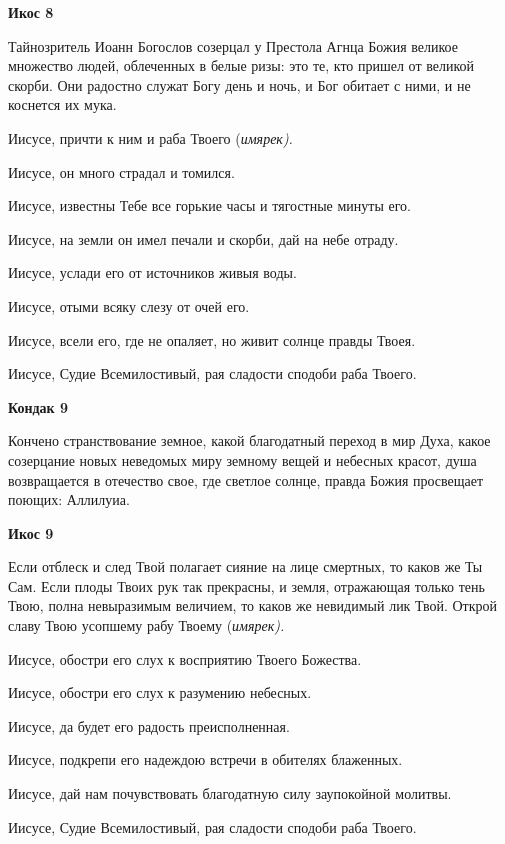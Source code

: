 \medskip


\bfseries Икос 8\normalfont{}


Тайнозритель Иоанн Богослов созерцал у Престола Агнца Божия великое множество людей, облеченных в белые ризы: это те, кто пришел от великой скорби. Они радостно служат Богу день и ночь, и Бог обитает с ними, и не коснется их мука. 

Иисусе, причти к ним и раба Твоего (\itshape имярек\normalfont{}). 

Иисусе, он много страдал и томился. 

Иисусе, известны Тебе все горькие часы и тягостные минуты его. 

Иисусе, на земли он имел печали и скорби, дай на небе отраду. 

Иисусе, услади его от источников живыя воды. 

Иисусе, отыми всяку слезу от очей его. 

Иисусе, всели его, где не опаляет, но живит солнце правды Твоея. 

Иисусе, Судие Всемилостивый, рая сладости сподоби раба Твоего.


\medskip


\bfseries Кондак 9\normalfont{}


Кончено странствование земное, какой благодатный переход в мир Духа, какое созерцание новых неведомых миру земному вещей и небесных красот, душа возвращается в отечество свое, где светлое солнце, правда Божия просвещает поющих: Аллилуиа.


\medskip


\bfseries Икос 9\normalfont{}


Если отблеск и след Твой полагает сияние на лице смертных, то каков же Ты Сам. Если плоды Твоих рук так прекрасны, и земля, отражающая только тень Твою, полна невыразимым величием, то каков же невидимый лик Твой. Открой славу Твою усопшему рабу Твоему (\itshape имярек\normalfont{}). 

Иисусе, обостри его слух к восприятию Твоего Божества. 

Иисусе, обостри его слух к разумению небесных. 

Иисусе, да будет его радость преисполненная. 

Иисусе, подкрепи его надеждою встречи в обителях блаженных. 

Иисусе, дай нам почувствовать благодатную силу заупокойной молитвы. 

Иисусе, Судие Всемилостивый, рая сладости сподоби раба Твоего.


